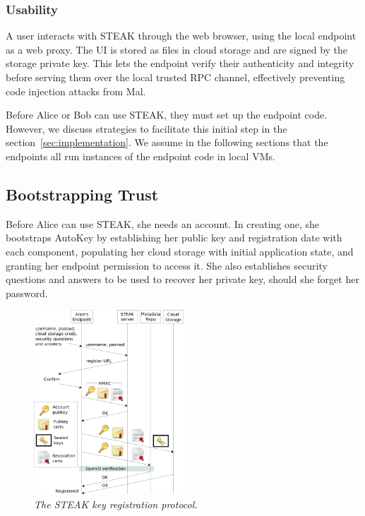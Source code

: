 \subsubsection{Usability}
A user interacts with STEAK through the web browser, using the local endpoint as a web proxy.  The UI is stored as files in cloud storage and are signed by the storage private key.  This lets the endpoint verify their authenticity and integrity before serving them over the local trusted RPC channel, effectively preventing code injection attacks from Mal.

Before Alice or Bob can use STEAK, they must set up the endpoint code.  However, we discuss strategies to facilitate this initial step in the section~\ref{sec:implementation}.  We assume in the following sections that the endpoints all run instances of the endpoint code in local VMs.

\subsection{Bootstrapping Trust}
Before Alice can use STEAK, she needs an account.  In creating one, she bootstraps AutoKey by establishing her public key and registration date with each component, populating her cloud storage with initial application state, and granting her endpoint permission to access it.  She also establishes security questions and answers to be used to recover her private key, should she forget her password.

\begin{figure}[h!]
\centering
\includegraphics[width=0.5\textwidth]{figures/register}
\caption{\it The STEAK key registration protocol.}
\label{fig:register}
\end{figure}

